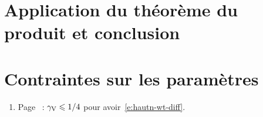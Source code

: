
\section{Application du théorème du produit et conclusion}

\section{Contraintes sur les paramètres}

\begin{enumerate}
  \item Page~\pageref{ct:Vcos<1/4} : \( \gamma \sb{\mathrm{V}} \leqslant 1/4 \) pour
    avoir~\eqref{e:hautn-wt-diff}.
\end{enumerate}

\endinput


